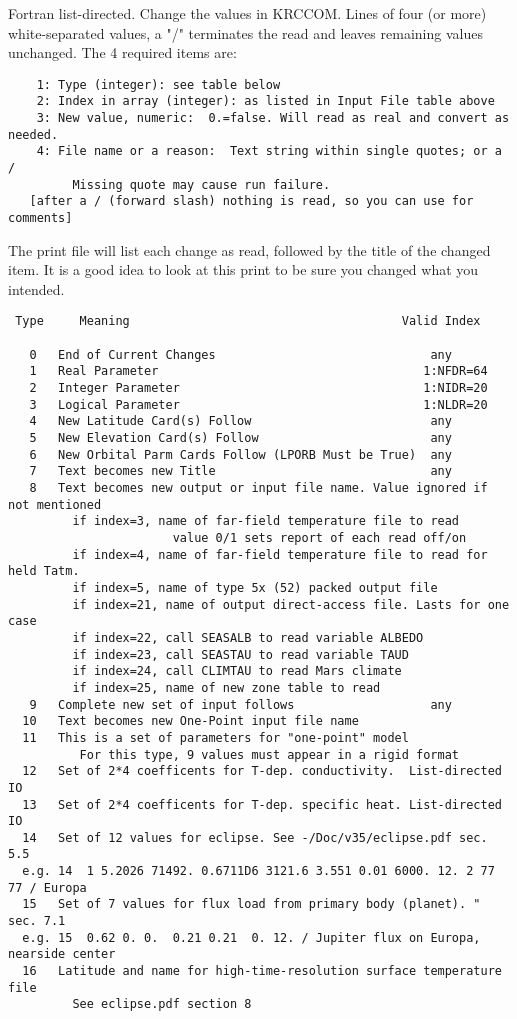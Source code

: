 \documentclass{article}
\begin{document}
Fortran list-directed.  Change the values in KRCCOM.  Lines of four (or more) 
white-separated values, a "/" terminates the read and leaves remaining values
unchanged.  The 4 required items are:
\vspace{-3.mm} 
\begin{verbatim}
    1: Type (integer): see table below
    2: Index in array (integer): as listed in Input File table above
    3: New value, numeric:  0.=false. Will read as real and convert as needed.
    4: File name or a reason:  Text string within single quotes; or a /
         Missing quote may cause run failure.
   [after a / (forward slash) nothing is read, so you can use for comments]
\end{verbatim}
The print file will list each change as read, followed by the title of the
changed item. It is a good idea to look at this print to be sure you changed
what you intended.

\begin{verbatim}
 Type     Meaning                                      Valid Index

   0   End of Current Changes                              any
   1   Real Parameter                                     1:NFDR=64
   2   Integer Parameter                                  1:NIDR=20
   3   Logical Parameter                                  1:NLDR=20
   4   New Latitude Card(s) Follow                         any
   5   New Elevation Card(s) Follow                        any
   6   New Orbital Parm Cards Follow (LPORB Must be True)  any
   7   Text becomes new Title                              any
   8   Text becomes new output or input file name. Value ignored if not mentioned
         if index=3, name of far-field temperature file to read
                       value 0/1 sets report of each read off/on
         if index=4, name of far-field temperature file to read for held Tatm.
         if index=5, name of type 5x (52) packed output file
         if index=21, name of output direct-access file. Lasts for one case
         if index=22, call SEASALB to read variable ALBEDO
         if index=23, call SEASTAU to read variable TAUD
         if index=24, call CLIMTAU to read Mars climate
         if index=25, name of new zone table to read
   9   Complete new set of input follows                   any
  10   Text becomes new One-Point input file name
  11   This is a set of parameters for "one-point" model 
          For this type, 9 values must appear in a rigid format
  12   Set of 2*4 coefficents for T-dep. conductivity.  List-directed IO
  13   Set of 2*4 coefficents for T-dep. specific heat. List-directed IO 
  14   Set of 12 values for eclipse. See -/Doc/v35/eclipse.pdf sec. 5.5 
  e.g. 14  1 5.2026 71492. 0.6711D6 3121.6 3.551 0.01 6000. 12. 2 77 77 / Europa
  15   Set of 7 values for flux load from primary body (planet). " sec. 7.1
  e.g. 15  0.62 0. 0.  0.21 0.21  0. 12. / Jupiter flux on Europa, nearside center
  16   Latitude and name for high-time-resolution surface temperature file
         See eclipse.pdf section 8
\end{verbatim}
 
\end{document}
